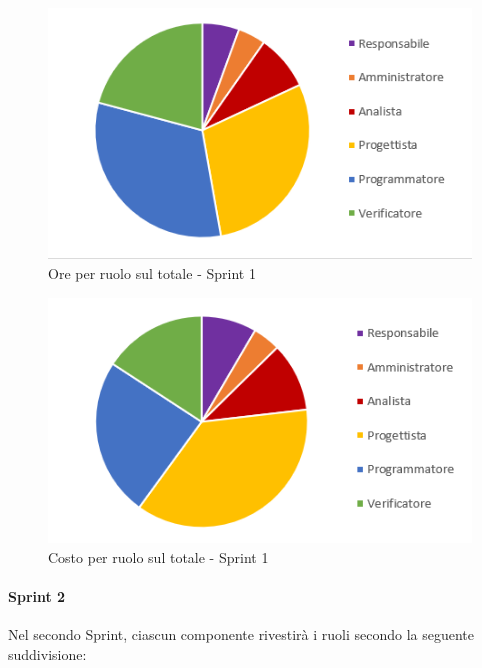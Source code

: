 \begin{figure}[H]
  \centering
  \includegraphics[scale=0.8]{immagini/1Sprint_oreRuolo.png}
  \caption{Ore per ruolo sul totale - Sprint 1}
\end{figure}

\begin{figure}[H]
  \centering
  \includegraphics[scale=0.8]{immagini/1Sprint_costoRuolo.png}
  \caption{Costo per ruolo sul totale - Sprint 1}
\end{figure}
\pagebreak


\paragraph{Sprint 2}
Nel secondo Sprint\glo{}, ciascun componente rivestirà i ruoli secondo la seguente suddivisione:

